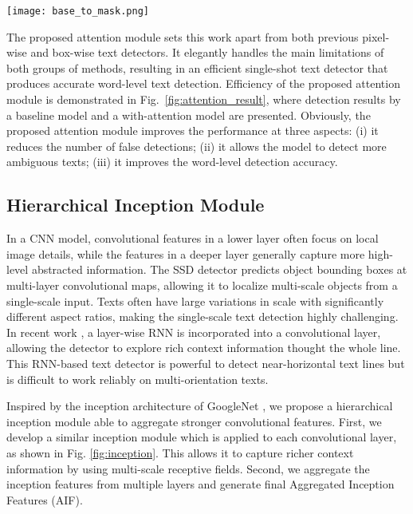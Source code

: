 \documentclass[10pt,twocolumn,letterpaper]{article}
\begin{document}
\begin{figure*}
   \centering
  \texttt{[image: base\_to\_mask.png]}
   \caption{We compare detection results of the baseline model and the model with our text attention module (TAM), which enables the detector with stronger capability for identifying extremely challenging text with a higher \textit{word-level} accuracy. }
   \label{fig:attention_result}
\end{figure*}


The proposed attention module sets this work apart from both previous pixel-wise and box-wise text detectors. It elegantly handles the main limitations of both groups of methods, resulting in an efficient single-shot text detector that produces accurate word-level text detection. Efficiency of the proposed attention module is demonstrated in Fig.~\ref{fig:attention_result}, where detection results by a baseline model and a with-attention model are presented. Obviously, the proposed attention module improves the performance at three aspects: (i) it reduces the number of false detections; (ii) it allows the model to detect more ambiguous texts; (iii) it improves the word-level detection accuracy.

\subsection{Hierarchical Inception Module}
In a CNN model, convolutional features in a lower layer often focus on local image details, while the features in a deeper layer generally capture more high-level abstracted information. The SSD detector predicts object bounding boxes at multi-layer convolutional maps, allowing it to localize multi-scale objects from a single-scale input. Texts often have large variations in scale with significantly different aspect ratios, making the single-scale text detection highly challenging. In recent work \cite{Tian2016}, a layer-wise RNN is incorporated into a convolutional layer,  allowing the detector to explore rich context information thought the whole line. This RNN-based text detector is powerful to detect near-horizontal text lines but is difficult to work reliably on multi-orientation texts.

Inspired by the inception architecture of GoogleNet \cite{szegedy2015going}, we propose a hierarchical inception module able to aggregate stronger convolutional features. First, we develop a similar inception module which is applied to each convolutional layer, as shown in Fig. \ref{fig:inception}. This allows it to capture richer context information by using multi-scale receptive fields. Second, we aggregate the inception features from multiple layers and generate final Aggregated Inception Features (AIF).
\end{document}
